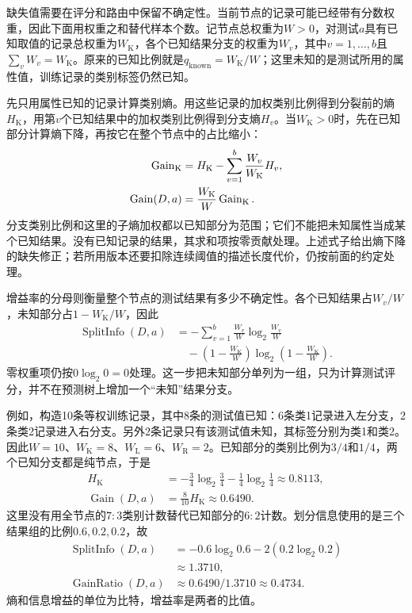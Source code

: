 缺失值需要在评分和路由中保留不确定性。当前节点的记录可能已经带有分数权重，因此下面用权重之和替代样本个数。记节点总权重为$W>0$，对测试$a$具有已知取值的记录总权重为$W_{\mathrm K}$，各个已知结果分支的权重为$W_v$，其中$v=1,\ldots,b$且$\sum_vW_v=W_{\mathrm K}$。原来的已知比例就是$q_{\mathrm{known}}=W_{\mathrm K}/W$；这里未知的是测试所用的属性值，训练记录的类别标签仍然已知。

先只用属性已知的记录计算类别熵。用这些记录的加权类别比例得到分裂前的熵$H_{\mathrm K}$，用第$v$个已知结果中的加权类别比例得到分支熵$H_v$。当$W_{\mathrm K}>0$时，先在已知部分计算熵下降，再按它在整个节点中的占比缩小：
\begin{align}
  \operatorname{Gain}_{\mathrm K}
    &=H_{\mathrm K}-\sum_{v=1}^b
        \frac{W_v}{W_{\mathrm K}}H_v,\notag\\
  \operatorname{Gain}(D,a)
    &=\frac{W_{\mathrm K}}{W}\operatorname{Gain}_{\mathrm K}.
  \label{eq:classification-c45-missing-gain}
\end{align}
分支类别比例和这里的子熵加权都以已知部分为范围；它们不能把未知属性当成某个已知结果。没有已知记录的结果，其求和项按零贡献处理。上述式子给出熵下降的缺失修正；若所用版本还要扣除连续阈值的描述长度代价，仍按前面的约定处理。

增益率的分母则衡量整个节点的测试结果有多少不确定性。各个已知结果占$W_v/W$，未知部分占$1-W_{\mathrm K}/W$，因此
\begin{equation}
  \begin{aligned}
    \operatorname{SplitInfo}(D,a)
      &=-\sum_{v=1}^b\frac{W_v}{W}
          \log_2\frac{W_v}{W}\\
      &\quad-\left(1-\frac{W_{\mathrm K}}{W}\right)
          \log_2\left(1-\frac{W_{\mathrm K}}{W}\right).
  \end{aligned}
  \label{eq:classification-c45-missing-split-info}
\end{equation}
零权重项仍按$0\log_2 0=0$处理。这一步把未知部分单列为一组，只为计算测试评分，并不在预测树上增加一个“未知”结果分支。

例如，构造10条等权训练记录，其中8条的测试值已知：6条类1记录进入左分支，2条类2记录进入右分支。另外2条记录只有该测试值未知，其标签分别为类1和类2。因此$W=10$、$W_{\mathrm K}=8$、$W_{\mathrm L}=6$、$W_{\mathrm R}=2$。已知部分的类别比例为$3/4$和$1/4$，两个已知分支都是纯节点，于是
\[
  \begin{aligned}
    H_{\mathrm K}
      &=-\frac34\log_2\frac34-\frac14\log_2\frac14
        \approx0.8113,\\
    \operatorname{Gain}(D,a)
      &=\frac8{10}H_{\mathrm K}\approx0.6490.
  \end{aligned}
\]
这里没有用全节点的$7:3$类别计数替代已知部分的$6:2$计数。划分信息使用的是三个结果组的比例$0.6,0.2,0.2$，故
\[
  \begin{aligned}
    \operatorname{SplitInfo}(D,a)
      &=-0.6\log_2 0.6-2(0.2\log_2 0.2)\\
      &\approx1.3710,\\
    \operatorname{GainRatio}(D,a)
      &\approx0.6490/1.3710\approx0.4734.
  \end{aligned}
\]
熵和信息增益的单位为比特，增益率是两者的比值。

